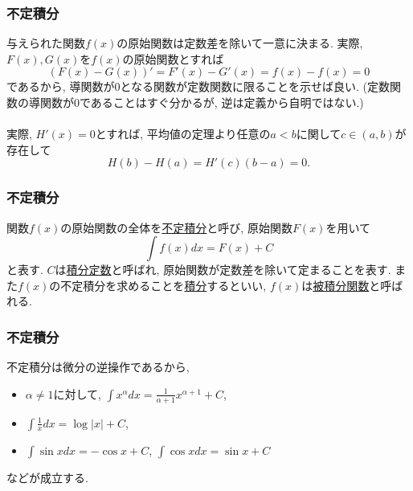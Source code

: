 \begin{frame}
\frametitle{不定積分}

与えられた関数$f(x)$の原始関数は定数差を除いて一意に決まる. 
実際, $F(x), G(x)$を$f(x)$の原始関数とすれば
$$
(F(x)-G(x))'=F'(x)-G'(x)=f(x)-f(x)=0
$$
であるから, 導関数が$0$となる関数が定数関数に限ることを示せば良い. 
(定数関数の導関数が$0$であることはすぐ分かるが, 逆は定義から自明ではない.)\\
\ \\

実際, $H'(x)=0$とすれば, 平均値の定理より任意の$a<b$に関して$c \in (a,b)$が存在して
$$
H(b)-H(a)=H'(c)(b-a)=0. 
$$

\end{frame}






\begin{frame}
\frametitle{不定積分}


\begin{Def}
関数$f(x)$の原始関数の全体を\underline{不定積分}と呼び, 原始関数$F(x)$を用いて   
$$
\int f(x)dx = F(x)+C
$$
と表す. $C$は\underline{積分定数}と呼ばれ, 原始関数が定数差を除いて定まることを表す. 
また$f(x)$の不定積分を求めることを\underline{積分}するといい, $f(x)$は\underline{被積分関数}と呼ばれる.  
\end{Def}
 


\end{frame}








\begin{frame}
\frametitle{不定積分}

不定積分は微分の逆操作であるから, 
\begin{itemize}
\item $\alpha \ne 1$に対して, $\displaystyle \int x^\alpha dx = \frac{1}{\alpha+1}x^{\alpha+1}+C$,
\item $\displaystyle \int \frac{1}{x}dx = \log |x|+C$,
\item $\displaystyle \int \sin x dx = -\cos x+C$, $\displaystyle \int \cos x dx = \sin x+C$
\end{itemize}
などが成立する. 

\end{frame}




